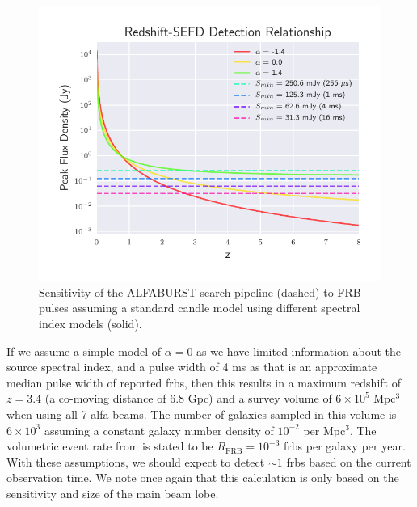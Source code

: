 \documentclass[a4paper,fleqn,usenatbib]{mnras}
\begin{document}
\begin{figure}
    \includegraphics[width=1.0\linewidth]{figures/fwhm_sefd_z_relation.pdf}
    \caption{Sensitivity of the ALFABURST search pipeline (dashed) to FRB pulses
    assuming a standard candle model using different spectral index models
    (solid).
    }
    \label{fig:fwhm_sefd_z}
\end{figure}

If we assume a simple model of $\alpha=0$ as we have limited
information about the source spectral index, and a pulse width of 4 ms
as that is an approximate median pulse width of reported \glspl{frb},
then this results in a maximum redshift of $z=3.4$ (a co-moving
distance of 6.8 Gpc) and a survey volume of $6 \times 10^5$ Mpc$^3$
when using all 7 \gls{alfa} beams. The number of galaxies sampled in
this volume is $6 \times 10^3$ assuming a constant galaxy number
density of $10^{-2}$ per Mpc$^3$.  The volumetric event rate from
\cite{2013Sci...341...53T} is stated to be $R_{\textrm{FRB}} =
10^{-3}$ \glspl{frb} per galaxy per year. With these assumptions, we
should expect to detect $\sim 1$ \glspl{frb} based on the current
observation time. We note once again that this calculation is only
based on the sensitivity and size of the main beam lobe.

\end{document}
